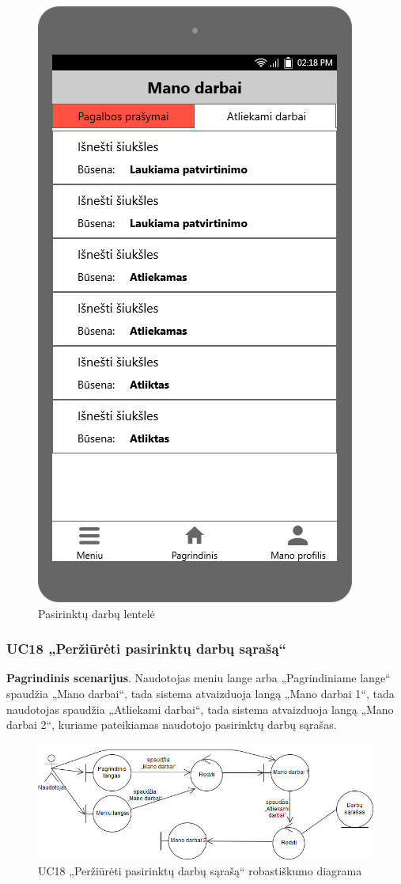\documentclass{VUMIFPSbakalaurinis}
\begin{document}
\begin{figure}[H]
	\centering
	\includegraphics[scale=0.4]{img/ScreenShots/06-Mano-darbai2}
	\caption{Pasirinktų darbų lentelė}
	\label{img:selected jobs table}
\end{figure}
\subsubsection{UC18 „Peržiūrėti pasirinktų darbų sąrašą“}
\textbf{Pagrindinis scenarijus}. Naudotojas meniu lange arba „Pagrindiniame lange“ spaudžia „Mano darbai“, tada sistema atvaizduoja langą „Mano darbai 1“, tada naudotojas spaudžia „Atliekami darbai“, tada sistema atvaizduoja langą „Mano darbai 2“, kuriame pateikiamas naudotojo pasirinktų darbų sąrašas.

\begin{figure}[H]
	\centering
	\includegraphics[scale=0.6]{img/Robustness/UC18}
	\caption{UC18 „Peržiūrėti pasirinktų darbų sąrašą“ robastiškumo diagrama}
	\label{img:uc18rob}
\end{figure}
\end{document}
